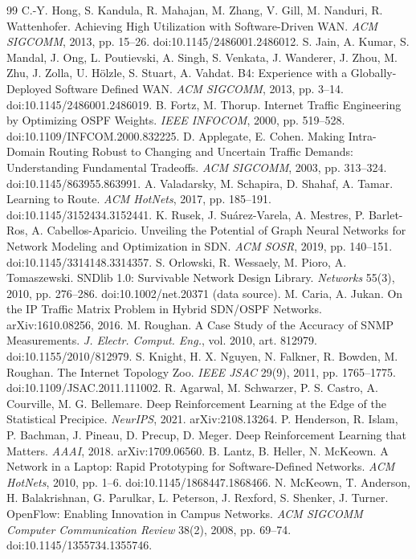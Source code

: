 \documentclass[journal]{IEEEtran}
\begin{document}
\begin{thebibliography}{99}
 C.-Y. Hong, S. Kandula, R. Mahajan, M. Zhang, V. Gill, M. Nanduri, R. Wattenhofer. Achieving High Utilization with Software-Driven WAN. \textit{ACM SIGCOMM}, 2013, pp. 15--26. doi:10.1145/2486001.2486012.
 S. Jain, A. Kumar, S. Mandal, J. Ong, L. Poutievski, A. Singh, S. Venkata, J. Wanderer, J. Zhou, M. Zhu, J. Zolla, U. Hölzle, S. Stuart, A. Vahdat. B4: Experience with a Globally-Deployed Software Defined WAN. \textit{ACM SIGCOMM}, 2013, pp. 3--14. doi:10.1145/2486001.2486019.
 B. Fortz, M. Thorup. Internet Traffic Engineering by Optimizing OSPF Weights. \textit{IEEE INFOCOM}, 2000, pp. 519--528. doi:10.1109/INFCOM.2000.832225.
 D. Applegate, E. Cohen. Making Intra-Domain Routing Robust to Changing and Uncertain Traffic Demands: Understanding Fundamental Tradeoffs. \textit{ACM SIGCOMM}, 2003, pp. 313--324. doi:10.1145/863955.863991.
 A. Valadarsky, M. Schapira, D. Shahaf, A. Tamar. Learning to Route. \textit{ACM HotNets}, 2017, pp. 185--191. doi:10.1145/3152434.3152441.
 K. Rusek, J. Suárez-Varela, A. Mestres, P. Barlet-Ros, A. Cabellos-Aparicio. Unveiling the Potential of Graph Neural Networks for Network Modeling and Optimization in SDN. \textit{ACM SOSR}, 2019, pp. 140--151. doi:10.1145/3314148.3314357.
 S. Orlowski, R. Wessaely, M. Pioro, A. Tomaszewski. SNDlib 1.0: Survivable Network Design Library. \textit{Networks} 55(3), 2010, pp. 276--286. doi:10.1002/net.20371 (data source).
 M. Caria, A. Jukan. On the IP Traffic Matrix Problem in Hybrid SDN/OSPF Networks. arXiv:1610.08256, 2016.
 M. Roughan. A Case Study of the Accuracy of SNMP Measurements. \textit{J. Electr. Comput. Eng.}, vol. 2010, art. 812979. doi:10.1155/2010/812979.
 S. Knight, H. X. Nguyen, N. Falkner, R. Bowden, M. Roughan. The Internet Topology Zoo. \textit{IEEE JSAC} 29(9), 2011, pp. 1765--1775. doi:10.1109/JSAC.2011.111002.
 R. Agarwal, M. Schwarzer, P. S. Castro, A. Courville, M. G. Bellemare. Deep Reinforcement Learning at the Edge of the Statistical Precipice. \textit{NeurIPS}, 2021. arXiv:2108.13264.
 P. Henderson, R. Islam, P. Bachman, J. Pineau, D. Precup, D. Meger. Deep Reinforcement Learning that Matters. \textit{AAAI}, 2018. arXiv:1709.06560.
 B. Lantz, B. Heller, N. McKeown. A Network in a Laptop: Rapid Prototyping for Software-Defined Networks. \textit{ACM HotNets}, 2010, pp. 1--6. doi:10.1145/1868447.1868466.
 N. McKeown, T. Anderson, H. Balakrishnan, G. Parulkar, L. Peterson, J. Rexford, S. Shenker, J. Turner. OpenFlow: Enabling Innovation in Campus Networks. \textit{ACM SIGCOMM Computer Communication Review} 38(2), 2008, pp. 69--74. doi:10.1145/1355734.1355746.
\end{thebibliography}
\end{document}
